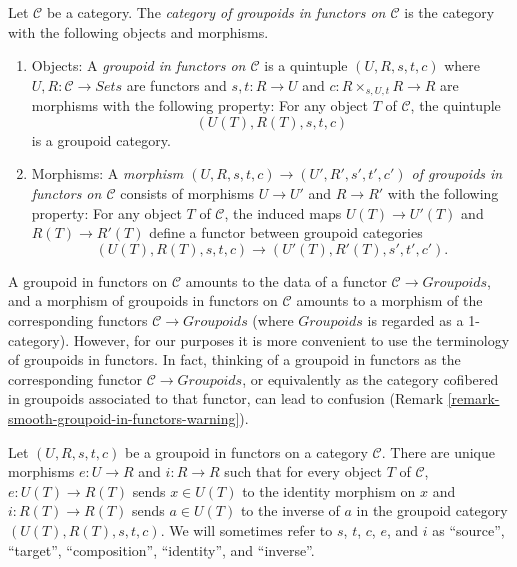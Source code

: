 \begin{definition}
\label{definition-groupoid-in-functors}
Let $\mathcal{C}$ be a category. The
{\it category of groupoids in functors on $\mathcal{C}$}
is the category with the following objects and morphisms.
\begin{enumerate}
\item Objects: A {\it groupoid in functors on $\mathcal{C}$} is a quintuple
$(U, R, s, t, c)$ where $U, R : \mathcal{C} \to \textit{Sets}$ are
functors and $s, t : R \to U$ and $c : R \times_{s, U, t} R \to R$
are morphisms with the following property: For any object $T$ of $\mathcal{C}$,
the quintuple
$$
(U(T), R(T), s, t, c)
$$
is a groupoid category.
\item Morphisms: A {\it morphism $(U, R, s, t, c) \to (U', R', s', t', c')$ of
groupoids in functors on $\mathcal{C}$} consists of morphisms $U \to U'$
and $R \to R'$ with the following property: For any object $T$ of
$\mathcal{C}$, the induced maps $U(T) \to U'(T)$ and
$R(T) \to R'(T)$ define a functor between groupoid categories
$$
(U(T), R(T), s, t, c) \to (U'(T), R'(T), s', t', c').
$$
\end{enumerate}
\end{definition}

\begin{remark}
\label{remark-confusion-groupoids-in-functors}
A groupoid in functors on $\mathcal{C}$ amounts to the data of a functor
$\mathcal{C} \to \textit{Groupoids}$, and a morphism of groupoids
in functors on $\mathcal{C}$ amounts to a morphism of the corresponding
functors
$\mathcal{C} \to \textit{Groupoids}$ (where
$\textit{Groupoids}$ is regarded as a 1-category).  However, for our
purposes it is more convenient to use the terminology of groupoids in functors.
In fact, thinking of a groupoid in functors as the corresponding functor
$\mathcal{C} \to \textit{Groupoids}$, or equivalently as the
category cofibered in groupoids associated to that functor, can lead to
confusion (Remark \ref{remark-smooth-groupoid-in-functors-warning}).
\end{remark}

\begin{remark}
\label{remark-identity-inverse}
Let $(U, R, s, t, c)$ be a groupoid in functors on a category $\mathcal{C}$.
There are unique morphisms $e : U \to R$ and $i : R \to R$ such that
for every object $T$ of $\mathcal{C}$, $e: U(T) \to R(T)$ sends
$x \in U(T)$ to the identity morphism on $x$ and $i: R(T) \to R(T)$ sends
$a \in U(T)$ to the inverse of $a$ in the groupoid category
$(U(T), R(T), s, t, c)$. We will sometimes refer to $s$, $t$, $c$, $e$,
and $i$ as ``source'', ``target'', ``composition'', ``identity'', and
``inverse''.
\end{remark}


